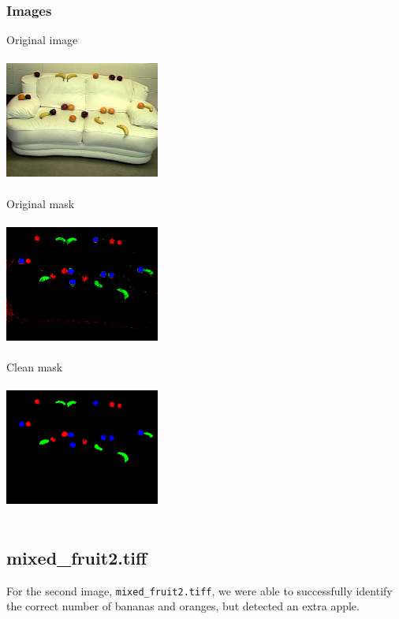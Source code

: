 \documentclass{article}
\begin{document}
\subsubsection{Images}
Original image\\~\\
\includegraphics[width=2in]{mixed_fruit1.png}\\~\\
Original mask\\~\\
\includegraphics[width=2in]{mixed_fruit1_step1.png}\\~\\
Clean mask\\~\\
\includegraphics[width=2in]{mixed_fruit1_step2.png}\\~\\

\subsection{mixed\_fruit2.tiff}
For the second image, \texttt{mixed\_fruit2.tiff}, we were able to successfully identify the correct number of bananas and oranges, but detected an extra apple. 
\end{document}
